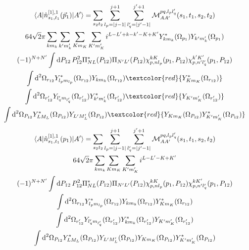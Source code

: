 \documentclass[10pt]{article}
\begin{document}
\begin{multline*}
\braket{ A | \hat{n}^{[1],1}_{s_1,t_1}(\vec{p}_1) | A'} = \sum_{s_2 t_2}  \sum_{l_p = |j-1|}^{j+1} \sum_{l_q' = |j' - 1|}^{j'+1} \mathcal{M}_{AA'}^{p q,l_p l_q'}(s_1,t_1,s_2,t_2) \\
64 \sqrt{2} \pi \sum_{k m_k} \sum_{k' m_k'} \sum_{K m_K} \sum_{K' m_K'} i^{L-L'+k-k'-K+K'} Y_{k m_k}^{*}(\Omega_{p_1}) Y_{k' m_k'}(\Omega_{p_1}) \\
 (-1)^{N+N'} \int \text{d} P_{12} \, P_{12}^{2} \Pi^{*}_{N L}(P_{12}) \Pi_{N' L'}(P_{12}) \chi_{p,nl_p}^{kK}(p_1,P_{12}) \chi_{p,n'l_q'}^{k'K'}(p_1,P_{12}) \\
 \int \text{d}^{2} \Omega_{r_{12}}  Y_{l_p m_{l_p} }^{*}(\Omega_{r_{12}}) Y_{k 
m_k}(\Omega_{r_{12}}) \textcolor{red}{Y_{K m_K}^{*}(\Omega_{r_{12}})} \\
 \int \text{d}^{2} \Omega_{r_{12}'}  Y_{ l_q' m_{l_q'} }(\Omega_{r_{12}'})  
Y_{k' m_k'}^{*}(\Omega_{r_{12}'}) \textcolor{red}{Y_{K' m_K'}(\Omega_{r_{12}'})}
\\
   \int \text{d}^{2} \Omega_{P_{12}}  Y_{L M_L}^{*}(\Omega_{P_{12}})  Y_{L' 
M_L'}(\Omega_{P_{12}}) \textcolor{red}{Y_{K m_K}(\Omega_{P_{12}}) Y_{K' 
m_K'}^{*}(\Omega_{P_{12}})}
\end{multline*}
\begin{multline*}
\braket{ A | \hat{n}^{[1],1}_{s_1,t_1}(p_1) | A'} = \sum_{s_2 t_2}  \sum_{l_p = |j-1|}^{j+1} \sum_{l_q' = |j' - 1|}^{j'+1} \mathcal{M}_{AA'}^{p q,l_p l_q'}(s_1,t_1,s_2,t_2) \\
64 \sqrt{2} \pi \sum_{k m_k} \sum_{K m_K} \sum_{K' m_K'} i^{L-L'-K+K'}  \\
 (-1)^{N+N'} \int \text{d} P_{12} \, P_{12}^{2} \Pi^{*}_{N L}(P_{12}) \Pi_{N' L'}(P_{12}) \chi_{p,nl_p}^{kK}(p_1,P_{12}) \chi_{p,n'l_q'}^{kK'}(p_1,P_{12}) \\
 \int \text{d}^{2} \Omega_{r_{12}}  Y_{l_p m_{l_p} }^{*}(\Omega_{r_{12}}) Y_{k m_k}(\Omega_{r_{12}}) Y_{K m_K}^{*}(\Omega_{r_{12}}) \\
 \int \text{d}^{2} \Omega_{r_{12}'}  Y_{ l_q' m_{l_q'} }(\Omega_{r_{12}'})  Y_{k m_k}^{*}(\Omega_{r_{12}'}) Y_{K' m_K'}(\Omega_{r_{12}'}) \\
   \int \text{d}^{2} \Omega_{P_{12}}  Y_{L M_L}^{*}(\Omega_{P_{12}})  Y_{L' M_L'}(\Omega_{P_{12}}) Y_{K m_K}(\Omega_{P_{12}}) Y_{K' m_K'}^{*}(\Omega_{P_{12}})
\end{multline*}
\end{document}

